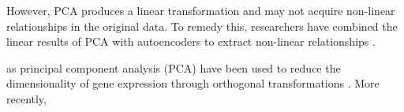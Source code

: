 However, PCA produces a linear transformation and may not acquire non-linear relationships in the original data. To remedy this, researchers have combined the linear results of PCA with autoencoders to extract non-linear relationships \cite{danaee2017deep}.

as principal component analysis (PCA) have been used to reduce the dimensionality of gene expression through orthogonal transformations \cite{danaee2017deep}. More recently,